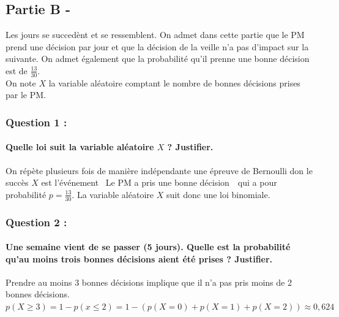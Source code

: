\documentclass[a4paper, 12pt]{article}
\begin{document}
{}
\subsection*{Partie B -}
Les jours se succedènt et se ressemblent. On admet dans cette partie que le PM prend une décision par jour et que la décision de la veille n'a pas d'impact sur la suivante. 
On admet également que la probabilité qu'il prenne une bonne décision est de $\frac{13}{30}$.
\\
On note $X$ la variable aléatoire comptant le nombre de bonnes décisions prises par le PM.

{}
\subsubsection*{Question 1 :}
\paragraph*{Quelle loi suit la variable aléatoire $X$ ? Justifier. \\[5mm]}

On répète plusieurs fois de manière indépendante une épreuve de Bernoulli don le succès $X$ est l'événement \guillemotleft \ Le PM a pris une bonne décision\ \guillemotright \
qui a pour probabilité $p = \frac{13}{30}$. La variable aléatoire $X$ suit donc une loi binomiale.

{}
\subsubsection*{Question 2 :}
\paragraph*{Une semaine vient de se passer (5 jours). Quelle est la probabilité qu'au moins trois bonnes décisions aient été prises ? Justifier.\\[5mm]}

Prendre au moins 3 bonnes décisions implique que il n'a pas pris moins de 2 bonnes décisions.\\
$p(X \geq 3) = 1 - p(x \leq 2) = 1- \left( p(X=0) + p(X = 1) + p(X = 2)\right) \approx 0,624$

{}
\end{document}
